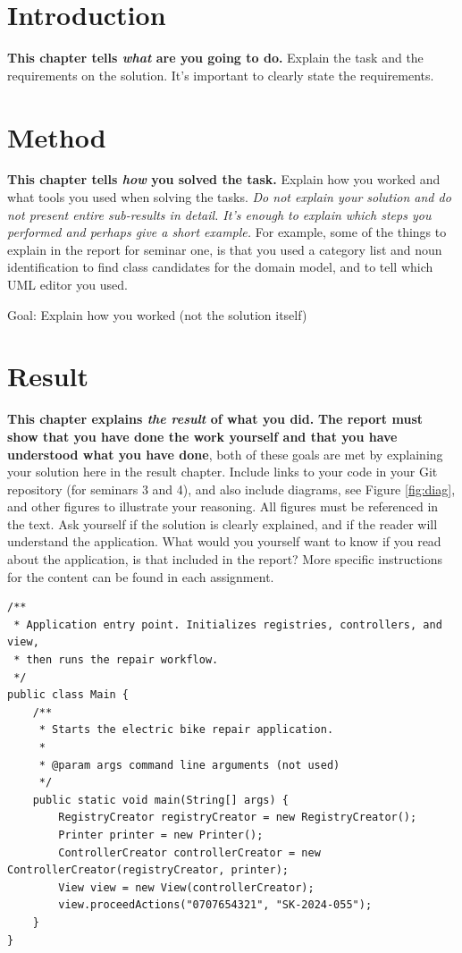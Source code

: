 \documentclass[a4paper]{scrartcl}
\begin{document}
\section{Introduction}
\label{sec:intro}

\textbf{This chapter tells \textit{what} are you going to do.} Explain the task and the requirements on the solution. It's important to clearly state the requirements.

\section{Method}

\textbf{This chapter tells \textit{how} you solved the task.} Explain how you worked and what tools you used when solving the tasks. \textit{Do not explain your solution and do not present entire sub-results in detail. It's enough to explain which steps you performed and perhaps give a short example.} For example, some of the things to explain in the report for seminar one, is that you used a category list and noun identification to find class candidates for the domain model, and to tell which UML editor you used.

Goal: Explain how you worked (not the solution itself)


\section{Result}
\label{sec:result}

\textbf{This chapter explains \textit{the result} of what you did.} \textbf{The report must show that you have done the work yourself and that you have understood what you have done}, both of these goals are met by explaining your solution here in the result chapter. Include links to your code in your Git repository (for seminars 3 and 4), and also include diagrams, see Figure \ref{fig:diag}, and other figures to illustrate your reasoning. All figures must be referenced in the text. Ask yourself if the solution is clearly explained, and if the reader will understand the application. What would you yourself want to know if you read about the application, is that included in the report? More specific instructions for the content can be found in each assignment. 

\begin{lstlisting}[style=javastyle, caption={Main class entry point}]
/**
 * Application entry point. Initializes registries, controllers, and view, 
 * then runs the repair workflow.
 */
public class Main {
    /**
     * Starts the electric bike repair application.
     *
     * @param args command line arguments (not used)
     */
    public static void main(String[] args) {
        RegistryCreator registryCreator = new RegistryCreator();
        Printer printer = new Printer();
        ControllerCreator controllerCreator = new ControllerCreator(registryCreator, printer);
        View view = new View(controllerCreator);
        view.proceedActions("0707654321", "SK-2024-055");
    }
}
\end{lstlisting}
\end{document}
